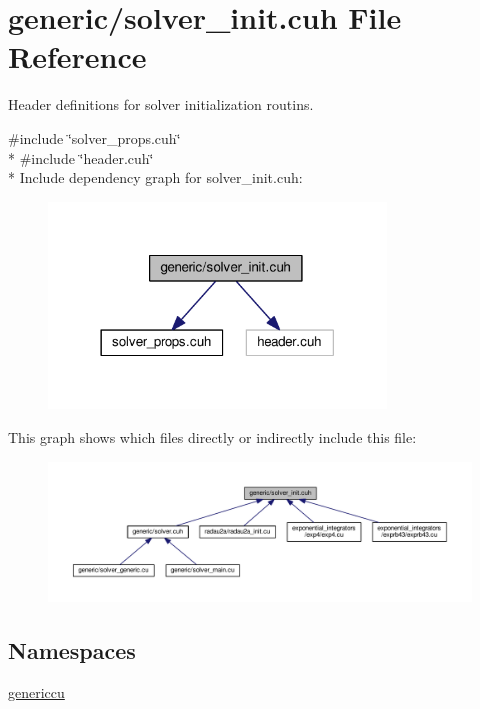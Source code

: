 \hypertarget{solver__init_8cuh}{}\section{generic/solver\+\_\+init.cuh File Reference}
\label{solver__init_8cuh}


Header definitions for solver initialization routins.  


{\ttfamily \#include \char`\"{}solver\+\_\+props.\+cuh\char`\"{}}\\*
{\ttfamily \#include \char`\"{}header.\+cuh\char`\"{}}\\*
Include dependency graph for solver\+\_\+init.\+cuh\+:\nopagebreak
\begin{figure}[H]
\begin{center}
\leavevmode
\includegraphics[width=254pt]{solver__init_8cuh__incl}
\end{center}
\end{figure}
This graph shows which files directly or indirectly include this file\+:\nopagebreak
\begin{figure}[H]
\begin{center}
\leavevmode
\includegraphics[width=350pt]{solver__init_8cuh__dep__incl}
\end{center}
\end{figure}
\subsection*{Namespaces}
\begin{DoxyCompactItemize}
\item 
 \hyperlink{namespacegenericcu}{genericcu}
\end{DoxyCompactItemize}
